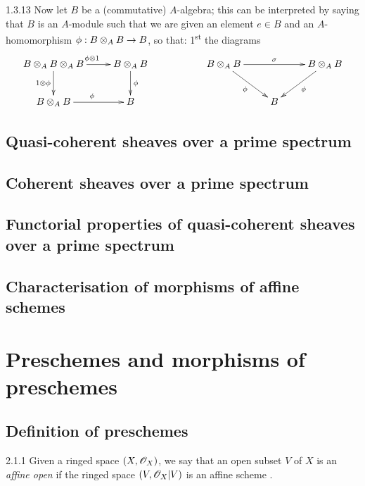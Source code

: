 \begin{env}{1.3.13}
\label{env-1.1.3.13}
Now let $B$ be a (commutative) $A$-algebra; this can be interpreted by saying that $B$ is an
$A$-module such that we are given an element $e\in B$ and an $A$-homomorphism
$\phi:B\otimes_A B\to B$, so that: 1\textsuperscript{st} the diagrams
\[
  \xymatrix{
    B\otimes_A B\otimes_A B\ar[r]^{\vphi\otimes 1}\ar[d]_{1\otimes\vphi} &
    B\otimes_A B\ar[d]^\vphi & &
    B\otimes_A B\ar[rr]^\sigma\ar[rd]_\vphi & &
    B\otimes_A B\ar[dl]^\vphi\\
    B\otimes_A B\ar[r]^\vphi &
    B & & & 
    B
  }
\]
\end{env}  

\subsection{Quasi-coherent sheaves over a prime spectrum}
\label{1-schemes-1.4}

\subsection{Coherent sheaves over a prime spectrum}
\label{1-schemes-1.5}

\subsection{Functorial properties of quasi-coherent sheaves over a prime spectrum}
\label{1-schemes-1.6}

\subsection{Characterisation of morphisms of affine schemes}
\label{1-schemes-1.7}

\section{Preschemes and morphisms of preschemes}
\label{1-schemes-2}

\subsection{Definition of preschemes}
\label{1-schemes-2.1}

\begin{env}{2.1.1}
\label{env-1.2.1.1}
Given a ringed space $(X,\mathscr{O}_X)$, we say that an open subset
$V$ of $X$ is an \emph{affine open} if the ringed space $(V,\mathscr{O}_X|V)$ is an
affine scheme .
\end{env}

